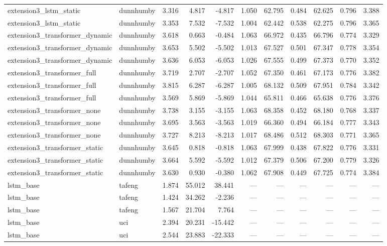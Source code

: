 \begin{table}
\begin{tabular}{llrrrrrrrrr}
extension3_lstm_static & dunnhumby & 3.316 & 4.817 & -4.817 & 1.050 & 62.795 & 0.484 & 62.625 & 0.796 & 3.388 \\
extension3_lstm_static & dunnhumby & 3.353 & 7.532 & -7.532 & 1.004 & 62.442 & 0.538 & 62.275 & 0.796 & 3.365 \\
extension3_transformer_dynamic & dunnhumby & 3.618 & 0.663 & -0.484 & 1.063 & 66.972 & 0.435 & 66.796 & 0.774 & 3.329 \\
extension3_transformer_dynamic & dunnhumby & 3.653 & 5.502 & -5.502 & 1.013 & 67.527 & 0.501 & 67.347 & 0.778 & 3.354 \\
extension3_transformer_dynamic & dunnhumby & 3.636 & 6.053 & -6.053 & 1.026 & 67.555 & 0.499 & 67.373 & 0.770 & 3.352 \\
extension3_transformer_full & dunnhumby & 3.719 & 2.707 & -2.707 & 1.052 & 67.350 & 0.461 & 67.173 & 0.776 & 3.382 \\
extension3_transformer_full & dunnhumby & 3.815 & 6.287 & -6.287 & 1.005 & 68.132 & 0.509 & 67.951 & 0.784 & 3.342 \\
extension3_transformer_full & dunnhumby & 3.569 & 5.869 & -5.869 & 1.044 & 65.811 & 0.466 & 65.638 & 0.776 & 3.376 \\
extension3_transformer_none & dunnhumby & 3.738 & 3.155 & -3.155 & 1.063 & 68.358 & 0.452 & 68.180 & 0.768 & 3.337 \\
extension3_transformer_none & dunnhumby & 3.695 & 3.563 & -3.563 & 1.019 & 66.360 & 0.494 & 66.184 & 0.777 & 3.343 \\
extension3_transformer_none & dunnhumby & 3.727 & 8.213 & -8.213 & 1.017 & 68.486 & 0.512 & 68.303 & 0.771 & 3.365 \\
extension3_transformer_static & dunnhumby & 3.645 & 0.818 & -0.818 & 1.063 & 67.999 & 0.438 & 67.822 & 0.776 & 3.331 \\
extension3_transformer_static & dunnhumby & 3.664 & 5.592 & -5.592 & 1.012 & 67.379 & 0.506 & 67.200 & 0.779 & 3.326 \\
extension3_transformer_static & dunnhumby & 3.630 & 0.930 & -0.380 & 1.062 & 67.908 & 0.449 & 67.725 & 0.774 & 3.384 \\
lstm_base & tafeng & 1.874 & 55.012 & 38.441 & — & — & — & — & — & — \\
lstm_base & tafeng & 1.424 & 34.262 & -2.236 & — & — & — & — & — & — \\
lstm_base & tafeng & 1.567 & 21.704 & 7.764 & — & — & — & — & — & — \\
lstm_base & uci & 2.394 & 20.231 & -15.442 & — & — & — & — & — & — \\
lstm_base & uci & 2.544 & 23.883 & -22.333 & — & — & — & — & — & — \\
\bottomrule
\end{tabular}
\end{table}
